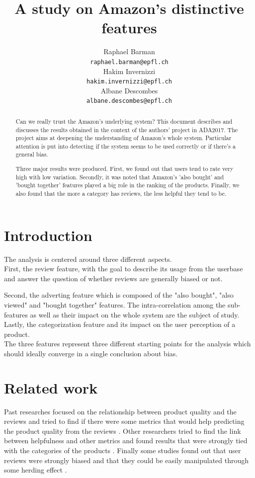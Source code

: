 \documentclass[11pt]{article}
\title{A study on Amazon's distinctive features}
\author{Raphael Barman \\
  {\small \tt raphael.barman@epfl.ch} \\\And
  Hakim Invernizzi \\
  {\small \tt hakim.invernizzi@epfl.ch} \\\And
Albane Descombes \\
{\small \tt albane.descombes@epfl.ch} \\}
\date{}
\begin{document}
\maketitle
\begin{abstract}
 Can we really trust the Amazon's underlying system? This document describes and discusses the results obtained in the context of the authors' project in ADA2017. The project aims at deepening the understanding 
  of Amazon's whole system. Particular attention is put into detecting if the system seems to be used correctly or if there's a general bias.\par
  Three major results were produced.
  First, we found out that users tend to rate very high with low variation. Secondly, it was noted that Amazon's 'also bought' and 'bought together' features played a big role in the ranking of the products. Finally, we also found that the more a category has reviews, the less helpful they tend to be.
\end{abstract}


\section{Introduction}
  The analysis is centered around three different aspects.\\ First, the review feature, with the goal to describe its usage from the userbase and answer the question of whether reviews are generally biased or not. \par 
 Second, the adverting feature which is composed of the "also bought", "also viewed" and "bought together" features. The intra-correlation among the sub-features as well as their impact on the whole system are the subject of study. \\
Lastly, the categorization feature and its impact on the user perception of a product. \\ 
The three features represent three different starting points for the analysis which should ideally converge in a single conclusion about bias.
  
\section{Related work}
Past researches focused on the relationship between product quality and the reviews and tried to find if there were some metrics that would help predicting the product quality from the reviews \cite{hu2006can}. Other researchers tried to find the link between helpfulness and other metrics and found results that were strongly tied with the categories of the products \cite{mudambi2010makes}. Finally some studies found out that user reviews were strongly biased and that they could be easily manipulated through some herding effect \cite{muchnik2013social}.
\end{document}
